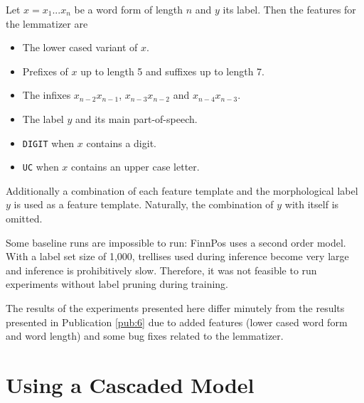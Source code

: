 Let $x = x_1 ... x_n$ be a word form of length $n$ and $y$ its
label. Then the features for the lemmatizer are
\begin{itemize}
\item The lower cased variant of $x$.
\item Prefixes of $x$ up to length 5 and suffixes up to length 7.
\item The infixes $x_{n - 2}x_{n - 1}$, $x_{n - 3}x_{n - 2}$ and $x_{n - 4}x_{n - 3}$.
\item The label $y$ and its main part-of-speech.
\item {\tt DIGIT} when $x$ contains a digit.
\item {\tt UC} when $x$ contains an upper case letter.
\end{itemize}
Additionally a combination of each feature template and the
morphological label $y$ is used as a feature template. Naturally, the
combination of $y$ with itself is omitted.

Some baseline runs are impossible to run: FinnPos uses a second order
model. With a label set size of 1,000, trellises used during inference
become very large and inference is prohibitively slow. Therefore, it
was not feasible to run experiments without label pruning during
training.

The results of the experiments presented here differ minutely from the
results presented in Publication \ref{pub:6} due to added features
(lower cased word form and word length) and some bug fixes related to
the lemmatizer.

\section{Using a Cascaded Model}

